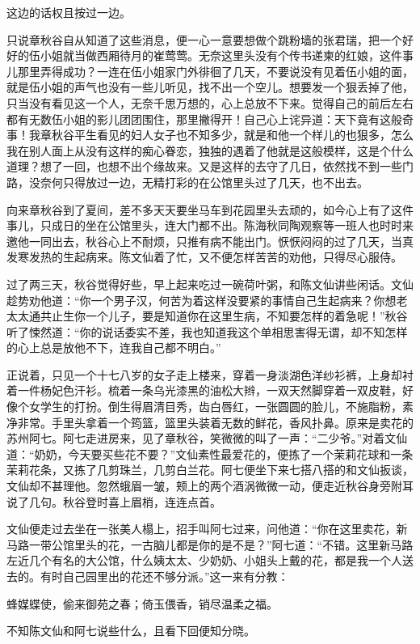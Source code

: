 \documentclass[12pt,UTF8]{ctexbook}
\begin{document}
{{{这边的话权且按过一边。

只说章秋谷自从知道了这些消息，便一心一意要想做个跳粉墙的张君瑞，把一个好好的伍小姐就当做西厢待月的崔莺莺。无奈这里头没有个传书递柬的红娘，这件事儿那里弄得成功？一连在伍小姐家门外徘徊了几天，不要说没有见着伍小姐的面，就是伍小姐的声气也没有一些儿听见，找不出一个空儿。想要发一个狠丢掉了他，只当没有看见这一个人，无奈千思万想的，心上总放不下来。觉得自己的前后左右都有无数伍小姐的影儿团团围住，那里撇得开！自己心上诧异道：天下竟有这般奇事！我章秋谷平生看见的妇人女子也不知多少，就是和他一个样儿的也狠多，怎么我在别人面上从没有这样的痴心眷恋，独独的遇着了他就是这般模样，这是个什么道理？想了一回，也想不出个缘故来。又是这样的去守了几日，依然找不到一些门路，没奈何只得放过一边，无精打彩的在公馆里头过了几天，也不出去。

向来章秋谷到了夏间，差不多天天要坐马车到花园里头去顽的，如今心上有了这件事儿，只成日的坐在公馆里头，连大门都不出。陈海秋同陶观察等一班人也时时来邀他一同出去，秋谷心上不耐烦，只推有病不能出门。恹恹闷闷的过了几天，当真发寒发热的生起病来。陈文仙着了忙，又不便怎样苦苦的劝他，只得尽心服侍。

过了两三天，秋谷觉得好些，早上起来吃过一碗荷叶粥，和陈文仙讲些闲话。文仙趁势劝他道：“你一个男子汉，何苦为着这样没要紧的事情自己生起病来？你想老太太通共止生你一个儿子，要是知道你在这里生病，不知要怎样的着急呢！”秋谷听了悚然道：“你的说话委实不差，我也知道我这个单相思害得无谓，却不知怎样的心上总是放他不下，连我自己都不明白。”

正说着，只见一个十七八岁的女子走上楼来，穿着一身淡湖色洋纱衫裤，上身却衬着一件杨妃色汗衫。梳着一条乌光漆黑的油松大辫，一双天然脚穿着一双皮鞋，好像个女学生的打扮。倒生得眉清目秀，齿白唇红，一张圆圆的脸儿，不施脂粉，素净非常。手里头拿着一个筠篮，篮里头装着无数的鲜花，香风扑鼻。原来是卖花的苏州阿七。阿七走进房来，见了章秋谷，笑微微的叫了一声：“二少爷。”对着文仙道：“奶奶，今天要买些花不要？”文仙素性最爱花的，便拣了一个茉莉花球和一条茉莉花条，又拣了几剪珠兰，几剪白兰花。阿七便坐下来七搭八搭的和文仙扳谈，文仙却不甚理他。忽然蛾眉一皱，颊上的两个酒涡微微一动，便走近秋谷身旁附耳说了几句。秋谷登时喜上眉梢，连连点首。

文仙便走过去坐在一张美人榻上，招手叫阿七过来，问他道：“你在这里卖花，新马路一带公馆里头的花，一古脑儿都是你的是不是？”阿七道：“不错。这里新马路左近几个有名的大公馆，什么姨太太、少奶奶、小姐头上戴的花，都是我一个人送去的。有时自己园里出的花还不够分派。”这一来有分教：

蜂媒蝶使，偷来御苑之春；倚玉偎香，销尽温柔之福。

不知陈文仙和阿七说些什么，且看下回便知分晓。





}}}
\end{document}
